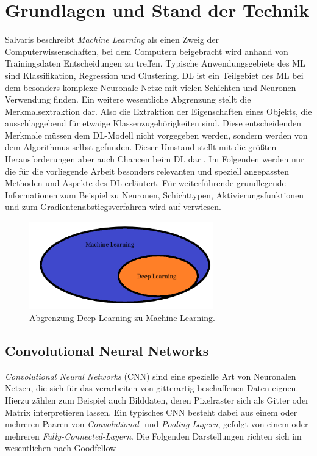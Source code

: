 \section{Grundlagen und Stand der Technik}

Salvaris beschreibt \textit{Machine Learning} als einen Zweig der Computerwissenschaften, bei dem Computern beigebracht wird anhand von Trainingsdaten Entscheidungen zu treffen. Typische Anwendungsgebiete des ML sind Klassifikation, Regression und Clustering. DL ist ein Teilgebiet des ML bei dem besonders komplexe Neuronale Netze mit vielen Schichten und Neuronen Verwendung finden. Ein weitere wesentliche Abgrenzung stellt die Merkmalsextraktion dar. Also die Extraktion der Eigenschaften eines Objekts, die ausschlaggebend für etwaige Klassenzugehörigkeiten sind. Diese entscheidenden Merkmale müssen dem DL-Modell nicht vorgegeben werden, sondern werden von dem Algorithmus selbst gefunden. Dieser Umstand stellt mit die größten Herausforderungen aber auch Chancen beim DL dar \cite[S.32-47]{dlazure2019}.  Im Folgenden werden nur die für die vorliegende Arbeit besonders relevanten und speziell angepassten Methoden und Aspekte des DL erläutert. Für weiterführende grundlegende Informationen zum Beispiel zu Neuronen, Schichttypen, Aktivierungsfunktionen und zum Gradientenabstiegsverfahren wird auf \cite{dlbook2018} verwiesen.
\begin{figure}[h!]\label{dlmlunterschied}
  \centering
  \includegraphics[width=8cm]{mldlunterschied.png}
  \caption{Abgrenzung Deep Learning zu Machine Learning.}
\end{figure}

\subsection{Convolutional Neural Networks}

\textit{Convolutional Neural Networks} (CNN) sind eine spezielle Art von Neuronalen Netzen, die sich für das verarbeiten von gitterartig beschaffenen Daten eignen. Hierzu zählen zum Beispiel auch Bilddaten, deren Pixelraster sich als Gitter oder Matrix interpretieren lassen. Ein typisches CNN besteht dabei aus einem oder mehreren Paaren von \textit{Convolutional}- und \textit{Pooling-Layern}, gefolgt von einem oder mehreren \textit{Fully-Connected-Layern}. Die Folgenden Darstellungen richten sich im wesentlichen nach Goodfellow \cite[S.326-366]{Goodfellow-et-al-2016}
